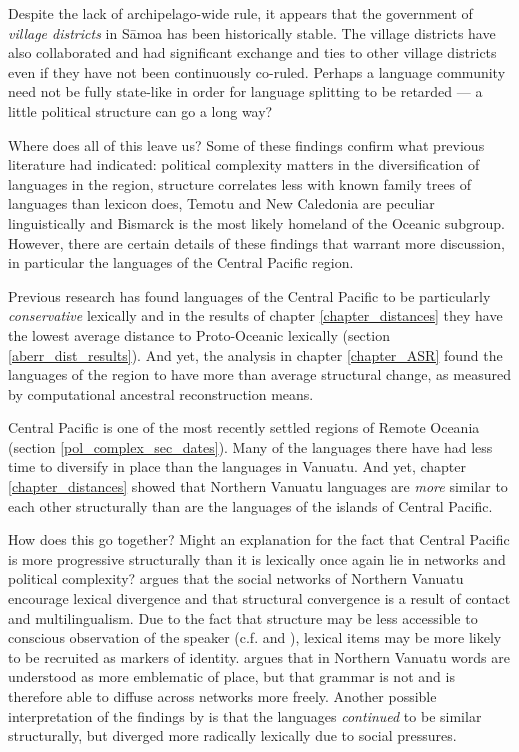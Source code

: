\documentclass[draft,10pt]{article} %
\begin{document}
Despite the lack of archipelago-wide rule, it appears that the government of \emph{village districts} in S\={a}moa has been historically stable. The village districts have also collaborated and had significant exchange and ties to other village districts even if they have not been continuously co-ruled. Perhaps a language community need not be fully state-like in order for language splitting to be retarded --- a little political structure can go a long way?

Where does all of this leave us? Some of these findings confirm what previous literature had indicated: political complexity matters in the diversification of languages in the region, structure correlates less with known family trees of languages than lexicon does, Temotu and New Caledonia are peculiar linguistically and Bismarck is the most likely homeland of the Oceanic subgroup. However, there are certain details of these findings that warrant more discussion, in particular the languages of the Central Pacific region.

Previous research has found languages of the Central Pacific to be particularly \emph{conservative} lexically \citep[323]{blust2000lexicostatistics} and in the results of chapter \ref{chapter_distances} they have the lowest average distance to Proto-Oceanic lexically (section \ref{aberr_dist_results}). And yet, the analysis in chapter \ref{chapter_ASR} found the languages of the region to have more than average structural change, as measured by computational ancestral reconstruction means. 

Central Pacific is one of the most recently settled regions of Remote Oceania (section \ref{pol_complex_sec_dates}). Many of the languages there have had less time to diversify in place than the languages in Vanuatu. And yet, chapter \ref{chapter_distances} showed that Northern Vanuatu languages are \emph{more} similar to each other structurally than are the languages of the islands of Central Pacific. 

How does this go together? Might an explanation for the fact that Central Pacific is more progressive structurally than it is lexically once again lie in networks and political complexity? \cite{francois2011} argues that the social networks of Northern Vanuatu encourage lexical divergence and that structural convergence is a result of contact and multilingualism. Due to the fact that structure may be less accessible to conscious observation of the speaker (c.f. \citet{silverstein1981limits} and \citet[237-238]{pawley2006explaining}), lexical items may be more likely to be recruited as markers of identity. \cite{francois2011} argues that in Northern Vanuatu words are understood as more emblematic of place, but that grammar is not and is therefore able to diffuse across networks more freely. Another possible interpretation of the findings by \cite{francois2011} is that the languages \emph{continued} to be similar structurally, but diverged more radically lexically due to social pressures.
\end{document}
